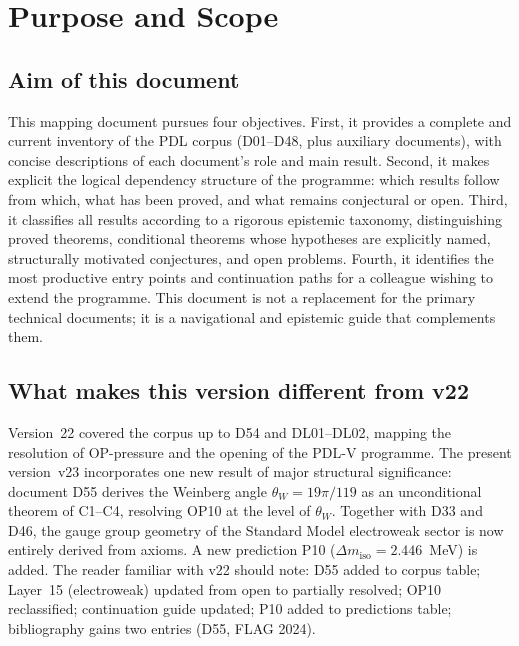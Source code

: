 \documentclass[11pt,a4paper]{article}
\theoremstyle{plain}
\theoremstyle{definition}
\theoremstyle{remark}
\begin{document}
\clearpage

\tableofcontents

\clearpage

\section{Purpose and Scope}
\label{sec:purpose}

\subsection{Aim of this document}
\label{subsec:aim}
This mapping document pursues four objectives. First, it provides a complete and current inventory of the PDL corpus (D01--D48, plus auxiliary documents), with concise descriptions of each document's role and main result. Second, it makes explicit the logical dependency structure of the programme: which results follow from which, what has been proved, and what remains conjectural or open. Third, it classifies all results according to a rigorous epistemic taxonomy, distinguishing proved theorems, conditional theorems whose hypotheses are explicitly named, structurally motivated conjectures, and open problems. Fourth, it identifies the most productive entry points and continuation paths for a colleague wishing to extend the programme. This document is not a replacement for the primary technical documents; it is a navigational and epistemic guide that complements them.

\subsection{What makes this version different from v22}
\label{subsec:diffv22}
Version~22 covered the corpus up to D54 and DL01--DL02, mapping the resolution of OP-pressure and the opening of the PDL-V programme. The present version~v23 incorporates one new result of major structural significance: document D55 derives the Weinberg angle $\theta_W = 19\pi/119$ as an unconditional theorem of C1--C4, resolving OP10 at the level of $\theta_W$. Together with D33 and D46, the gauge group geometry of the Standard Model electroweak sector is now entirely derived from axioms. A new prediction P10 ($\Delta m_{\mathrm{iso}} = 2.446$~MeV) is added. The reader familiar with v22 should note: D55 added to corpus table; Layer~15 (electroweak) updated from open to partially resolved; OP10 reclassified; continuation guide updated; P10 added to predictions table; bibliography gains two entries (D55, FLAG 2024).
\end{document}
